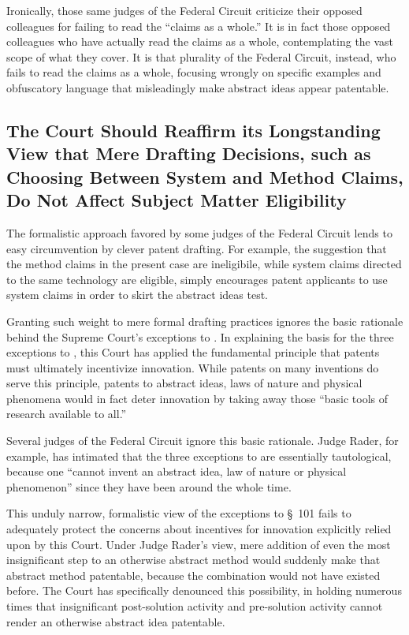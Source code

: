 \documentclass{scotus}
\begin{document}
Ironically, those same judges of the Federal Circuit criticize their opposed
colleagues for failing to read the ``claims as a whole.'' It is in fact those
opposed colleagues who have actually read the claims as a whole, contemplating
the vast scope of what they cover. It is that plurality of the Federal Circuit,
instead, who fails to read the claims as a whole, focusing wrongly on specific
examples and obfuscatory language that misleadingly make abstract ideas appear
patentable.

\subsection{The Court Should Reaffirm its Longstanding View that Mere Drafting
Decisions, such as Choosing Between System and Method Claims, Do Not Affect
Subject Matter Eligibility}

The formalistic approach favored by some judges of the Federal Circuit lends to
easy circumvention by clever patent drafting. For example, the suggestion that
the method claims in the present case are ineligibile, while system claims
directed to the same technology are eligible, simply encourages patent
applicants to use system claims in order to skirt the abstract ideas test.

Granting such weight to mere formal drafting practices ignores the basic
rationale behind the Supreme Court's exceptions to . In explaining
the basis for the three exceptions to , this Court has applied the
fundamental principle that patents must ultimately incentivize innovation. While
patents on many inventions do serve this principle, patents to abstract ideas,
laws of nature and physical phenomena would in fact deter innovation by taking
away those ``basic tools of research available to all.''

Several judges of the Federal Circuit ignore this basic rationale. Judge Rader,
for example, has intimated that the three exceptions to  are
essentially tautological, because one ``cannot invent an abstract idea, law of
nature or physical phenomenon'' since they have been around the whole time.

This unduly narrow, formalistic view of the exceptions to \S~101 fails to
adequately protect the concerns about incentives for innovation explicitly
relied upon by this Court. Under Judge Rader's view, mere addition of even the
most insignificant step to an otherwise abstract method would suddenly make that
abstract method patentable, because the combination would not have existed
before. The Court has specifically denounced this possibility, in holding
numerous times that insignificant post-solution activity and pre-solution
activity cannot render an otherwise abstract idea patentable.
\end{document}
